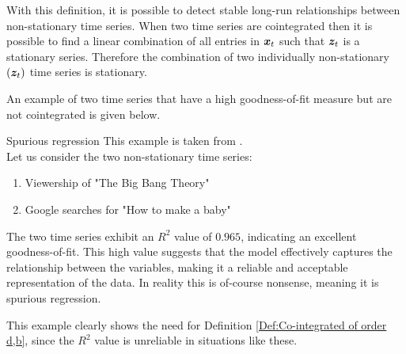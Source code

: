 \noindent With this definition, it is possible to detect stable long-run relationships between non-stationary time series. When two time series are cointegrated then it is possible to find a linear combination of all entries in $\boldsymbol{x}_t$ such that $\boldsymbol{z}_t$ is a stationary series. Therefore the combination of two individually non-stationary $(\boldsymbol{z}_t)$ time series is stationary.




\noindent An example of two time series that have a high goodness-of-fit measure but are not cointegrated is given below. 
\begin{ekse}{Spurious regression}
This example is taken from \cite{Spurious_example}.\\
    Let us consider the two non-stationary time series:
    \begin{enumerate}
        \item Viewership of "The Big Bang Theory"
        \item Google searches for "How to make a baby"
    \end{enumerate}
  The two time series exhibit an $R^2$ value of $0.965$, indicating an excellent goodness-of-fit. This high value suggests that the model effectively captures the relationship between the variables, making it a reliable and acceptable representation of the data. In reality this is of-course nonsense, meaning it is spurious regression.
\end{ekse}
\noindent This example clearly shows the need for Definition \ref{Def:Co-integrated of order d,b}, since the $R^2$ value is unreliable in situations like these.
\begin{comment}
\begin{defi}{Error Correction}
    A vector time series $x_t$ can be expressed using error correction if it can be written as:
    \begin{align*}
        A(B)(1-B)x_t=-\gamma z_{t_{t-1}}+u_t
    \end{align*}
    where $u_t$ is a stationary multivariate disturbance, $A(0)=I$, $A(1)$ has all elements finite, $z_\tau=\alpha^Tx_\tau$ and $\gamma\neq0$.
\end{defi}
Definition from \cite{co-Integration_and_error_correction}
The error correction model is a tool used when 
\end{comment}

